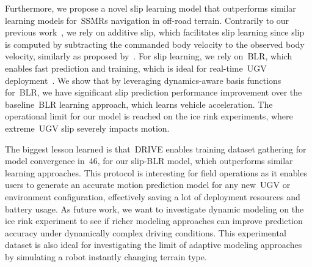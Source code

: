 \documentclass[12pt,letterpaper,oneside]{article}
\begin{document}
Furthermore, we propose a novel slip learning model that outperforms similar learning models for~\acp{SSMR} navigation in off-road terrain.
Contrarily to our previous work~\citep{Baril2020}, we rely on additive slip, which facilitates slip learning since slip is computed by subtracting the commanded body velocity to the observed body velocity, similarly as proposed by~\citet{Seegmiller2014}.
For slip learning, we rely on~\ac{BLR}, which enables fast prediction and training, which is ideal for real-time~\ac{UGV} deployment~\citep{Mckinnon2019}.
We show that by leveraging dynamics-aware basis functions for~\ac{BLR}, we have significant slip prediction performance improvement over the baseline~\ac{BLR} learning approach, which learns vehicle acceleration.
The operational limit for our model is reached on the ice rink experiments, where extreme~\ac{UGV} slip severely impacts motion.

The biggest lesson learned is that~\ac{DRIVE} enables training dataset gathering for model convergence in~\SI{46}{\sec}, for our slip-\ac{BLR} model, which outperforms similar learning approaches.
This protocol is interesting for field operations as it enables users to generate an accurate motion prediction model for any new~\ac{UGV} or environment configuration, effectively saving a lot of deployment resources and battery usage.
As future work, we want to investigate dynamic modeling on the ice rink experiment to see if richer modeling approaches can improve prediction accuracy under dynamically complex driving conditions.
This experimental dataset is also ideal for investigating the limit of adaptive modeling approaches by simulating a robot instantly changing terrain type.

\begin{center}
	\textbf{}
\end{center}
\end{document}
